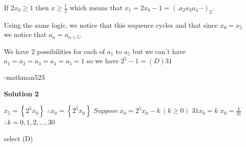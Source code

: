 \begin{enumerate}
 If $2x_0 \geq 1$ then $x \geq \frac{1}{2}$ which means that $x_1 = 2x_0 - 1 = (.a_2 a_3 a_4 \cdots)_2$.

 Using the same logic, we notice that this sequence cycles and that since $x_0 = x_5$ we notice that $a_n = a_{n+5}$. 

 We have $2$ possibilities for each of $a_1$ to $a_5$ but we can't have $a_1 = a_2 = a_3 = a_4 = a_5 = 1$ so we have $2^5 - 1 = \boxed{(D)31}$

 -mathman523

 



\textbf{Solution 2}

$x_5 = \left\{ 2^5x_0 \right\}$
$\therefore x_0 = \left\{ 2^5x_0 \right\}$
$Suppose \  x_0 = 2^5 x_0 - k \ (k \geq 0)$
$31x_0 = k$
$x_0 = \frac{k}{31}$
$\therefore k = 0, 1, 2,..., 30$

 select (D)

 


\end{enumerate}